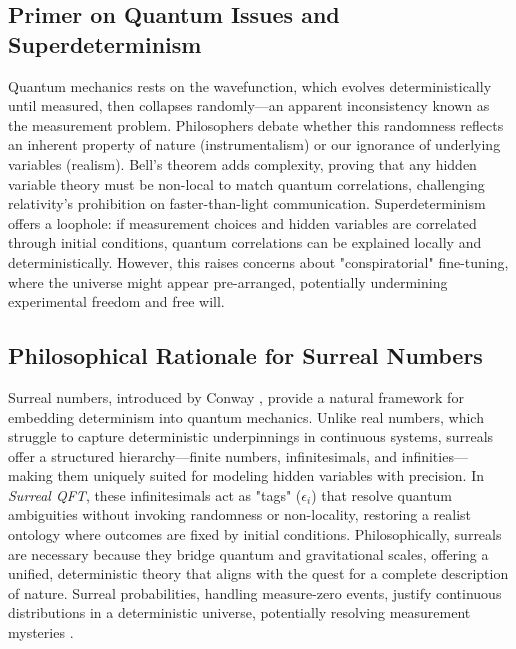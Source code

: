 \documentclass{article}
\begin{document}
\subsection{Primer on Quantum Issues and Superdeterminism}
Quantum mechanics rests on the wavefunction, which evolves deterministically until measured, then collapses randomly—an apparent inconsistency known as the measurement problem. Philosophers debate whether this randomness reflects an inherent property of nature (instrumentalism) or our ignorance of underlying variables (realism). Bell's theorem adds complexity, proving that any hidden variable theory must be non-local to match quantum correlations, challenging relativity's prohibition on faster-than-light communication. Superdeterminism offers a loophole: if measurement choices and hidden variables are correlated through initial conditions, quantum correlations can be explained locally and deterministically. However, this raises concerns about "conspiratorial" fine-tuning, where the universe might appear pre-arranged, potentially undermining experimental freedom and free will.

\subsection{Philosophical Rationale for Surreal Numbers}
Surreal numbers, introduced by Conway \cite{Conway1976}, provide a natural framework for embedding determinism into quantum mechanics. Unlike real numbers, which struggle to capture deterministic underpinnings in continuous systems, surreals offer a structured hierarchy—finite numbers, infinitesimals, and infinities—making them uniquely suited for modeling hidden variables with precision. In \textit{Surreal QFT}, these infinitesimals act as "tags" (\(\epsilon_i\)) that resolve quantum ambiguities without invoking randomness or non-locality, restoring a realist ontology where outcomes are fixed by initial conditions. Philosophically, surreals are necessary because they bridge quantum and gravitational scales, offering a unified, deterministic theory that aligns with the quest for a complete description of nature. Surreal probabilities, handling measure-zero events, justify continuous distributions in a deterministic universe, potentially resolving measurement mysteries \cite{Pruss2010}.
\end{document}

